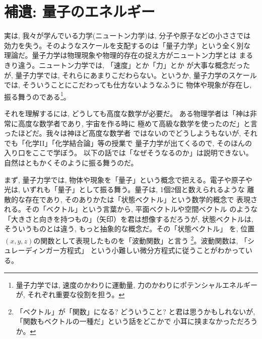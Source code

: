 \section{補遺: 量子のエネルギー}

実は, 我々が学んでいる力学(ニュートン力学)は, 分子や原子などの小ささでは
効力を失う。そのようなスケールを支配するのは「量子力学」という全く別な
理論だ。量子力学は物理現象や物理的存在の捉え方がニュートン力学とは
まるきり違う。ニュートン力学では, 「速度」とか「力」とか
が大事な概念だったが, 量子力学では, それらにあまりこだわらない。というか, 
量子力学のスケールでは, そういうことにこだわっても仕方ないようなふうに
物体や現象が存在し, 振る舞うのである\footnote{量子力学では, 
速度のかわりに運動量, 力のかわりにポテンシャルエネルギーが, 
それぞれ重要な役割を担う。}。

それを理解するには, どうしても高度な数学が必要だ。
ある物理学者は「神は非常に高度な数学者であり, 宇宙を作る時に
極めて高級な数学を使ったのだ」と言ったほどだ。我々は神ほど高度な数学者
ではないのでどうしようもないが, それでも「化学II」「化学結合論」等の授業で
量子力学が出てくるので, そのほんの入り口をここで学ぼう。
以下の話では「なぜそうなるのか」は説明できない。
自然はともかくそのように振る舞うのだ。

まず, 量子力学では, 物体や現象を「量子」という概念で把える。電子や原子や
光は, いずれも「量子」として振る舞う。量子は, 1個2個と数えられるような
離散的な存在であり, そのありかたは「状態ベクトル」という数学的概念で
表現される。その「ベクトル」という言葉から, 平面ベクトルや空間ベクトル
のような「大きさと向きを持つもの」（矢印）を君は想像するだろうが, 
状態ベクトルは, そういうものとは違う, もっと抽象的な概念だ。その「状態ベクトル」
を, 位置$(x, y, z)$の関数として表現したものを「波動関数」と言う
\footnote{「ベクトル」が「関数」になる? どういうこと?
 と君は思うかもしれないが, 「関数もベクトルの一種だ」という話をどこかで
小耳に挟まなかっただろうか。}。波動関数は, 「シュレーディンガー方程式」
という小難しい微分方程式に従うことがわかっている。


